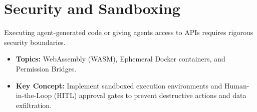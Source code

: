 \section{Security and Sandboxing}
Executing agent-generated code or giving agents access to APIs requires rigorous security boundaries.
\begin{itemize}
    \item \textbf{Topics:} WebAssembly (WASM), Ephemeral Docker containers, and Permission Bridges.
    \item \textbf{Key Concept:} Implement sandboxed execution environments and Human-in-the-Loop (HITL) approval gates to prevent destructive actions and data exfiltration.
\end{itemize}
